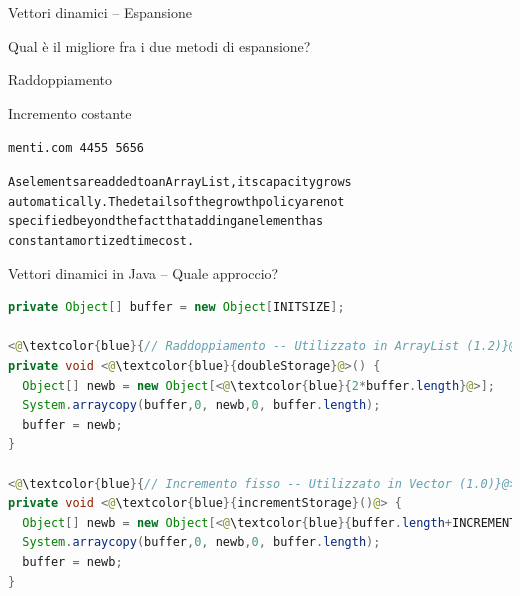 \begin{frame}[fragile]{Vettori dinamici -- Espansione}

\vspace{-9pt}
\begin{myboxtitle}[Domanda]
Qual è il migliore fra i due metodi di espansione?
\BI
\item Raddoppiamento
\item Incremento costante
\EI
\end{myboxtitle}

\begin{overprint}
\bigskip
\bigskip
{\Large
\texttt{menti.com 		4455 5656}
}
\begin{myboxtitle}
\begin{alltt}
As elements are added to an \alert{ArrayList}, its capacity grows 
automatically. The details of the growth policy are not 
specified beyond the fact that adding an element has 
\alert{constant} amortized time cost.
\end{alltt}
\end{myboxtitle}
\end{overprint}


\end{frame}

\begin{frame}{Vettori dinamici in Java -- Quale approccio?}

\vspace{-9pt}
\begin{lstlisting}[language=java]
private Object[] buffer = new Object[INITSIZE];

<@\textcolor{blue}{// Raddoppiamento -- Utilizzato in ArrayList (1.2)}@>
private void <@\textcolor{blue}{doubleStorage}@>() {
  Object[] newb = new Object[<@\textcolor{blue}{2*buffer.length}@>];
  System.arraycopy(buffer,0, newb,0, buffer.length);
  buffer = newb;
}

<@\textcolor{blue}{// Incremento fisso -- Utilizzato in Vector (1.0)}@>
private void <@\textcolor{blue}{incrementStorage}()@> {
  Object[] newb = new Object[<@\textcolor{blue}{buffer.length+INCREMENT}@>];
  System.arraycopy(buffer,0, newb,0, buffer.length);
  buffer = newb;
}
\end{lstlisting}

\end{frame}



